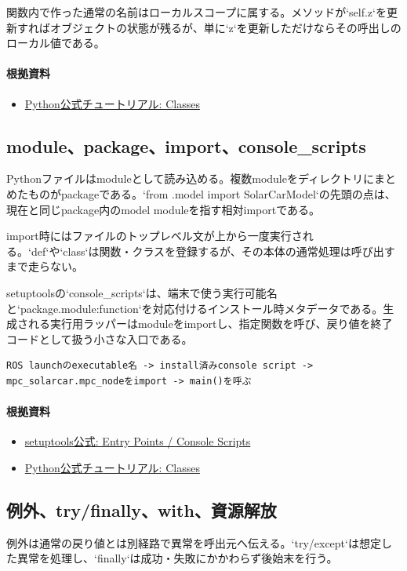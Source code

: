 \documentclass[a4paper,11pt]{article}
\begin{document}
関数内で作った通常の名前はローカルスコープに属する。メソッドが`self.z`を更新すればオブジェクトの状態が残るが、単に`z`を更新しただけならその呼出しのローカル値である。

\paragraph{根拠資料}
\begin{itemize}[leftmargin=1.6em]
\item \href{https://docs.python.org/3/tutorial/classes.html}{Python公式チュートリアル: Classes}
\end{itemize}

\subsection{module、package、import、console\_scripts}
Pythonファイルはmoduleとして読み込める。複数moduleをディレクトリにまとめたものがpackageである。`from .model import SolarCarModel`の先頭の点は、現在と同じpackage内のmodel moduleを指す相対importである。


import時にはファイルのトップレベル文が上から一度実行される。`def`や`class`は関数・クラスを登録するが、その本体の通常処理は呼び出すまで走らない。


setuptoolsの`console\_scripts`は、端末で使う実行可能名と`package.module:function`を対応付けるインストール時メタデータである。生成される実行用ラッパーはmoduleをimportし、指定関数を呼び、戻り値を終了コードとして扱う小さな入口である。


\begin{lstlisting}
ROS launchのexecutable名 -> install済みconsole script -> mpc_solarcar.mpc_nodeをimport -> main()を呼ぶ
\end{lstlisting}

\paragraph{根拠資料}
\begin{itemize}[leftmargin=1.6em]
\item \href{https://setuptools.pypa.io/en/latest/userguide/entry_point.html}{setuptools公式: Entry Points / Console Scripts}
\item \href{https://docs.python.org/3/tutorial/classes.html}{Python公式チュートリアル: Classes}
\end{itemize}

\subsection{例外、try/finally、with、資源解放}
例外は通常の戻り値とは別経路で異常を呼出元へ伝える。`try/except`は想定した異常を処理し、`finally`は成功・失敗にかかわらず後始末を行う。
\end{document}
